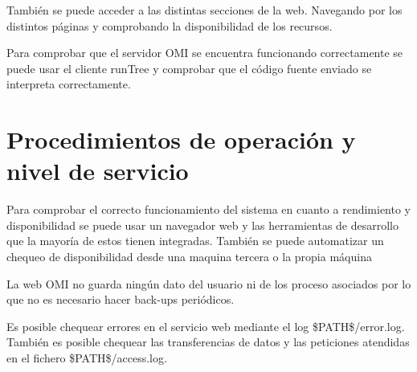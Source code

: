 También se puede acceder a las distintas secciones de la web. Navegando por los distintos páginas y comprobando la disponibilidad de los recursos.
 
 Para comprobar que el servidor OMI se encuentra funcionando correctamente se puede usar el cliente runTree y comprobar
 que el código fuente enviado se interpreta correctamente.
 
 \section{Procedimientos de operación y nivel de servicio}
 Para comprobar el correcto funcionamiento  del sistema en cuanto a rendimiento y disponibilidad se puede usar 
 un navegador web y las herramientas de desarrollo que la mayoría de estos tienen integradas. También se puede automatizar 
 un chequeo de disponibilidad desde una maquina tercera o la propia máquina
 
 La web OMI no guarda ningún dato del usuario ni de los proceso asociados por lo que no es necesario hacer back-ups periódicos. 
 
 Es posible chequear errores en el servicio web mediante el log \$PATH\$/error.log. También es posible
 chequear las transferencias de datos y las peticiones atendidas en el fichero \$PATH\$/access.log.
